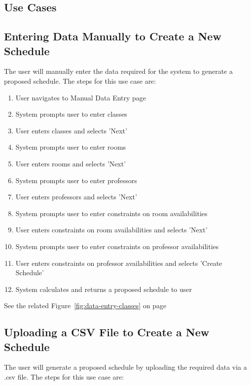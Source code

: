 \documentclass{extarticle}
\begin{document}
\begin{appendices}
\section{Use Cases}

\subsection{Entering Data Manually to Create a New Schedule}
The user will manually enter the data required for the system to generate a proposed schedule.  The steps for this
use case are:

\begin{enumerate}
    \item User navigates to Manual Data Entry page
    \item System prompts user to enter classes
    \item User enters classes and selects 'Next'
    \item System prompts user to enter rooms
    \item User enters rooms and selects 'Next'
    \item System prompts user to enter professors
    \item User enters professors and selects 'Next'
    \item System prompts user to enter constraints on room availabilities
    \item User enters constraints on room availabilities and selects 'Next'
    \item System prompts user to enter constraints on professor availabilities
    \item User enters constraints on professor availabilities and selects 'Create Schedule'
    \item System calculates and returns a proposed schedule to user
\end{enumerate}

See the related Figure~\ref{fig:data-entry-classes} on page~\pageref{fig:data-entry-classes}

\subsection{Uploading a CSV File to Create a New Schedule}
The user will generate a proposed schedule by uploading the required data via a .csv file.  The steps for this use
case are:


\end{appendices}
\end{document}
